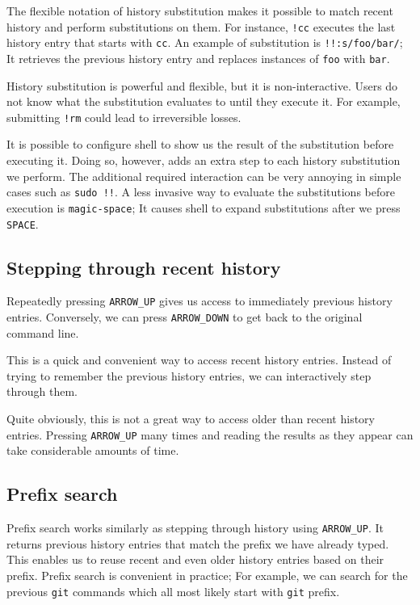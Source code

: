 The flexible notation of history substitution makes it possible to match recent history and perform substitutions on them. For instance, \verb|!cc| executes the last history entry that starts with \verb|cc|. An example of substitution is \verb|!!:s/foo/bar/|; It retrieves the previous history entry and replaces instances of \verb|foo| with \verb|bar|.

History substitution is powerful and flexible, but it is non-interactive. Users do not know what the substitution evaluates to until they execute it. For example, submitting \verb|!rm| could lead to irreversible losses.

It is possible to configure shell to show us the result of the substitution before executing it. Doing so, however, adds an extra step to each history substitution we perform. The additional required interaction can be very annoying in simple cases such as \verb|sudo !!|. A less invasive way to evaluate the substitutions before execution is \verb|magic-space|; It causes shell to expand substitutions after we press \verb|SPACE|.

\subsection{Stepping through recent history}

Repeatedly pressing \verb|ARROW_UP| gives us access to immediately previous history entries. Conversely, we can press \verb|ARROW_DOWN| to get back to the original command line. 

This is a quick and convenient way to access recent history entries. Instead of trying to remember the previous history entries, we can interactively step through them.

Quite obviously, this is not a great way to access older than recent history entries. Pressing \verb|ARROW_UP| many times and reading the results as they appear can take considerable amounts of time.

\subsection{Prefix search}

Prefix search works similarly as stepping through history using \verb|ARROW_UP|. It returns previous history entries that match the prefix we have already typed. 
This enables us to reuse recent and even older history entries based on their prefix. Prefix search is convenient in practice; For example, we can search for the previous \verb|git| commands which all most likely start with \verb|git| prefix.

